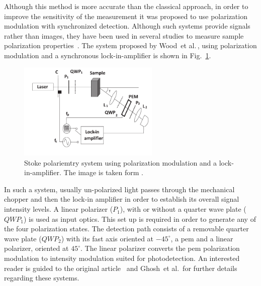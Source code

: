 Although this method is more accurate than the classical approach, in order to improve the sensitivity of the measurement it was proposed to use polarization modulation with synchronized detection.
Although such systems provide signals rather than images, they have been used in several studies to measure sample polarization properties~\cite{sankaran2002comparative,wood2008towards}. 
The system proposed by Wood~et al.\,\cite{wood2008towards}, using polarization modulation and a synchronous lock-in-amplifier is shown in Fig.~\ref{fig:pmodulationStokes}.
	\begin{figure}
	\centering 
	\includegraphics[width = 0.6\textwidth]{Chapter4/Figures/PMSDpolarimetry.png}	
	\caption[Polarimetry system proposed by Wood~et al.\,\cite{wood2008towards}]{Stoke polariemtry system using polarization modulation and a lock-in-amplifier. The image is taken form \cite{wood2008towards}.}
	\label{fig:pmodulationStokes}
	\end{figure}
In such a system, usually un-polarized light passes through the mechanical chopper and then the lock-in amplifier in order to establish its overall signal intensity levels. A linear polarizer ($P_{1}$), with or without a quarter wave plate ($QWP_{1}$) is used as input optics.
This set up is required in order to generate any of the four polarization states.
The detection path consists of a removable quarter wave plate ($QWP_{2}$) with its fast axis oriented at $-45^{\circ}$, a \ac{pem} and a linear polarizer, oriented at $45^{\circ}$.
The linear polarizer converts the \ac{pem} polarization modulation to intensity modulation suited for photodetection.
An interested reader is guided to the original article~\cite{wood2008towards} and Ghosh~et al.\,\cite{ghosh2011tissue} for further details regarding these systems.


